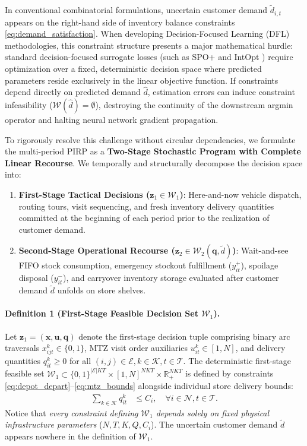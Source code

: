 \documentclass[11pt,a4paper]{article}
\theoremstyle{definition}
\theoremstyle{remark}
\begin{document}
In conventional combinatorial formulations, uncertain customer demand $\tilde{d}_{i,t}$ appears on the right-hand side of inventory balance constraints \eqref{eq:demand_satisfaction}. When developing Decision-Focused Learning (DFL) methodologies, this constraint structure presents a major mathematical hurdle: standard decision-focused surrogate losses (such as SPO+ \citep{elmachtoub2022smart} and IntOpt \citep{mandi2020interior}) require optimization over a fixed, deterministic decision space where predicted parameters reside exclusively in the linear objective function. If constraints depend directly on predicted demand $\hat{d}$, estimation errors can induce constraint infeasibility ($\mathcal{W}(\hat{d}) = \emptyset$), destroying the continuity of the downstream argmin operator and halting neural network gradient propagation.

To rigorously resolve this challenge without circular dependencies, we formulate the multi-period PIRP as a \textbf{Two-Stage Stochastic Program with Complete Linear Recourse}. We temporally and structurally decompose the decision space into:
\begin{enumerate}[label=(\roman*)]
    \item \textbf{First-Stage Tactical Decisions ($\mathbf{z}_1 \in \mathcal{W}_1$)}: Here-and-now vehicle dispatch, routing tours, visit sequencing, and fresh inventory delivery quantities committed at the beginning of each period prior to the realization of customer demand.
    \item \textbf{Second-Stage Operational Recourse ($\mathbf{z}_2 \in \mathcal{W}_2(\mathbf{q}, \tilde{d})$)}: Wait-and-see FIFO stock consumption, emergency stockout fulfillment ($y_{it}^+$), spoilage disposal ($y_{it}^-$), and carryover inventory storage evaluated after customer demand $\tilde{d}$ unfolds on store shelves.
\end{enumerate}

\paragraph{Definition 1 (First-Stage Feasible Decision Set $\mathcal{W}_1$).}
Let $\mathbf{z}_1 = (\mathbf{x}, \mathbf{u}, \mathbf{q})$ denote the first-stage decision tuple comprising binary arc traversals $x_{ijt}^k \in \{0, 1\}$, MTZ visit order auxiliaries $u_{it}^k \in [1, N]$, and delivery quantities $q_{it}^k \ge 0$ for all $(i, j) \in \mathcal{E}, k \in \mathcal{K}, t \in \mathcal{T}$. The deterministic first-stage feasible set $\mathcal{W}_1 \subset \{0, 1\}^{|\mathcal{E}| K T} \times [1, N]^{N K T} \times \mathbb{R}_+^{N K T}$ is defined by constraints \eqref{eq:depot_depart}--\eqref{eq:mtz_bounds} alongside individual store delivery bounds:
\begin{align}
    \sum_{k \in \mathcal{K}} q_{it}^k &\le C_i, \quad \forall i \in \mathcal{N}, t \in \mathcal{T}. \label{eq:w1_store_cap}
\end{align}
Notice that \textit{every constraint defining $\mathcal{W}_1$ depends solely on fixed physical infrastructure parameters} ($N, T, K, Q, C_i$). The uncertain customer demand $\tilde{d}$ appears nowhere in the definition of $\mathcal{W}_1$.
\end{document}

